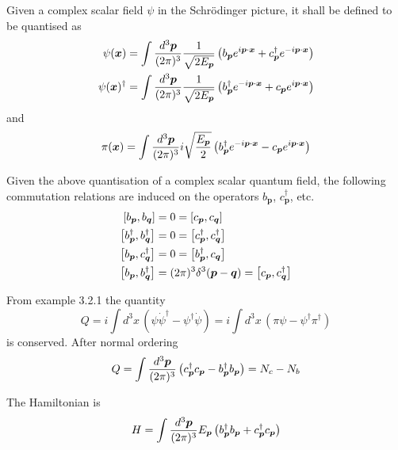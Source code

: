 \documentclass{article}
\begin{document}
\begin{definition}
Given a complex scalar field $\psi$ in the Schr\"odinger picture, it shall be defined to be quantised as
\begin{align*}
\psi(\bm{x}) &= \int\tmeas  \frac{1}{\sqrt{2E_{\bm{p}}}} \left( b_{\bm{p}} e^{i\bm{p}\cdot\bm{x}} + c_{\bm{p}}^\dagger e^{-i\bm{p}\cdot\bm{x}} \right) \\ 
\psi(\bm{x})^\dagger &= \int\tmeas  \frac{1}{\sqrt{2E_{\bm{p}}}} \left( b_{\bm{p}}^\dagger e^{-i\bm{p}\cdot\bm{x}} + c_{\bm{p}} e^{i\bm{p}\cdot\bm{x}} \right)
\end{align*}
and
\[
\pi(\bm{x})=\int\tmeas  i\sqrt{\frac{E_{\bm{p}}}{2}} \left( b_{\bm{p}}^\dagger e^{-i\bm{p}\cdot\bm{x}} - c_{\bm{p}} e^{i\bm{p}\cdot\bm{x}} \right)
\]
\end{definition}

\begin{theorem}
Given the above quantisation of a complex scalar quantum field, the following commutation relations are induced on the operators $b_{\bm{p}}$, $c_{\bm{p}}^\dagger$, etc. 
\begin{align*}
    \comm[b_{\bm{p}}]{b_{\bm{q}}} &= 0 = \comm[c_{\bm{p}}]{c_{\bm{q}}} \\
    \comm[b_{\bm{p}}^\dagger]{b_{\bm{q}}^\dagger} &= 0 = \comm[c_{\bm{p}}^\dagger]{c_{\bm{q}}^\dagger} \\
    \comm[b_{\bm{p}}]{c_{\bm{q}}^\dagger} &= 0 = \comm[b_{\bm{p}}^\dagger]{c_{\bm{q}}}\\
    \comm[b_{\bm{p}}]{b_{\bm{q}}^\dagger} &= (2\pi)^3 \delta^3(\bm{p}-\bm{q}) = \comm[c_{\bm{p}}]{c_{\bm{q}}^\dagger}
\end{align*}
\end{theorem}

\begin{theorem}
From example 3.2.1 the quantity
\[
Q=i \int d^3x \, \left( \psi\dot{\psi}^\dagger-\psi^\dagger\dot{\psi} \right) = i \int d^3x \, \left( \pi\psi - \psi^\dagger \pi^\dagger \right)
\]
is conserved. After normal ordering 
\[
Q=\int \tmeas \left( c_{\bm{p}}^\dagger c_{\bm{p}} - b_{\bm{p}}^\dagger b_{\bm{p}} \right) = N_c - N_b
\]
\end{theorem}

\begin{theorem}
The Hamiltonian is 
\[
H = \int\tmeas E_{\bm{p}} \left( b_{\bm{p}}^\dagger b_{\bm{p}} + c_{\bm{p}}^\dagger c_{\bm{p}} \right)
\]
\end{theorem}
\end{document}
